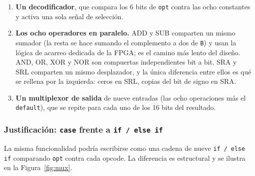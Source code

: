 \documentclass[12pt,a4paper]{article}
\begin{document}
\begin{enumerate}[leftmargin=2em,itemsep=0.25em]
  \item \textbf{Un decodificador}, que compara los 6 bits de \texttt{opt} contra
        las ocho constantes y activa una sola señal de selección.

  \item \textbf{Los ocho operadores en paralelo.} ADD y SUB comparten un mismo
        sumador (la resta se hace sumando el complemento a dos de \texttt{B}) y
        usan la lógica de acarreo dedicada de la FPGA; es el camino más lento
        del diseño. AND, OR, XOR y NOR son compuertas independientes bit a bit.
        SRA y SRL comparten un mismo desplazador, y la única diferencia entre
        ellos es qué se rellena por la izquierda: ceros en SRL, copias del bit
        de signo en SRA.

  \item \textbf{Un multiplexor de salida} de nueve entradas (las ocho
        operaciones más el \texttt{default}), que se repite para cada uno de los
        16 bits del resultado.
\end{enumerate}

\subsubsection{Justificación: \texttt{case} frente a \texttt{if / else if}}

La misma funcionalidad podría escribirse como una cadena de nueve
\texttt{if / else if} comparando \texttt{opt} contra cada opcode. La diferencia
es estructural y se ilustra en la Figura~\ref{fig:mux}.
\end{document}
